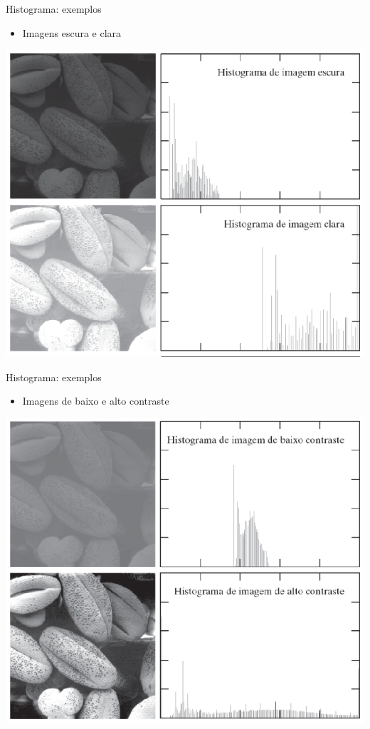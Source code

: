     \begin{slide}[toc=]{Histograma: exemplos}
      \begin{itemize}
         \item Imagens escura e clara
      \end{itemize}
         \begin{center}
             \includegraphics[height=0.65\textheight]{figs/fig0316a}
         \end{center}
    \end{slide}

    \begin{slide}[toc=]{Histograma: exemplos}
      \begin{itemize}
         \item Imagens de baixo e alto contraste
      \end{itemize}
         \begin{center}
             \includegraphics[height=0.65\textheight]{figs/fig0316b}
         \end{center}
    \end{slide}

